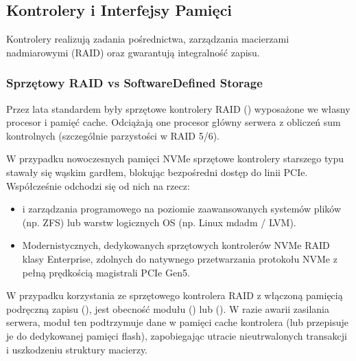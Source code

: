 \documentclass[letterpaper,10pt,polish]{sphinxmanual}
\begin{document}
\subsection{Kontrolery i Interfejsy Pamięci}
\label{\detokenize{rozdzia_u0142_2/rozdzia_u0142_21/index:kontrolery-i-interfejsy-pamieci}}
\sphinxAtStartPar
Kontrolery realizują zadania pośrednictwa, zarządzania macierzami nadmiarowymi (RAID) oraz gwarantują integralność zapisu.


\subsubsection{Sprzętowy RAID vs Software\sphinxhyphen{}Defined Storage}
\label{\detokenize{rozdzia_u0142_2/rozdzia_u0142_21/index:sprzetowy-raid-vs-software-defined-storage}}
\sphinxAtStartPar
Przez lata standardem były sprzętowe kontrolery RAID () wyposażone we własny procesor i pamięć cache. Odciążają one procesor główny serwera z obliczeń sum kontrolnych (szczególnie parzystości w RAID 5/6).

\sphinxAtStartPar
W przypadku nowoczesnych pamięci NVMe sprzętowe kontrolery starszego typu stawały się wąskim gardłem, blokując bezpośredni dostęp do linii PCIe. Współcześnie odchodzi się od nich na rzecz:
\begin{itemize}
\item {} 
\sphinxAtStartPar
{} i zarządzania programowego na poziomie zaawansowanych systemów plików (np. ZFS) lub warstw logicznych OS (np. Linux mdadm / LVM).

\item {} 
\sphinxAtStartPar
Modernistycznych, dedykowanych sprzętowych kontrolerów NVMe RAID klasy Enterprise, zdolnych do natywnego przetwarzania protokołu NVMe z pełną prędkością magistrali PCIe Gen5.

\end{itemize}

\sphinxAtStartPar
{}
W przypadku korzystania ze sprzętowego kontrolera RAID z włączoną pamięcią podręczną zapisu (),  jest obecność modułu  () lub  (). W razie awarii zasilania serwera, moduł ten podtrzymuje dane w pamięci cache kontrolera (lub przepisuje je do dedykowanej pamięci flash), zapobiegając utracie nieutrwalonych transakcji i uszkodzeniu struktury macierzy.
\end{document}
